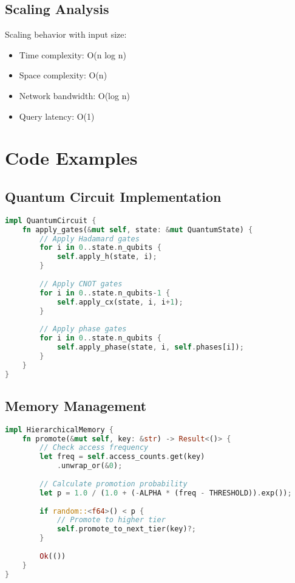 \documentclass[10pt]{article}
\begin{document}
\subsection{Scaling Analysis}

Scaling behavior with input size:

\begin{itemize}
    \item Time complexity: O(n log n)
    \item Space complexity: O(n)
    \item Network bandwidth: O(log n)
    \item Query latency: O(1)
\end{itemize}

\section{Code Examples}

\subsection{Quantum Circuit Implementation}

\begin{lstlisting}[language=rust]
impl QuantumCircuit {
    fn apply_gates(&mut self, state: &mut QuantumState) {
        // Apply Hadamard gates
        for i in 0..state.n_qubits {
            self.apply_h(state, i);
        }
        
        // Apply CNOT gates
        for i in 0..state.n_qubits-1 {
            self.apply_cx(state, i, i+1);
        }
        
        // Apply phase gates
        for i in 0..state.n_qubits {
            self.apply_phase(state, i, self.phases[i]);
        }
    }
}
\end{lstlisting}

\subsection{Memory Management}

\begin{lstlisting}[language=rust]
impl HierarchicalMemory {
    fn promote(&mut self, key: &str) -> Result<()> {
        // Check access frequency
        let freq = self.access_counts.get(key)
            .unwrap_or(&0);
            
        // Calculate promotion probability
        let p = 1.0 / (1.0 + (-ALPHA * (freq - THRESHOLD)).exp());
        
        if random::<f64>() < p {
            // Promote to higher tier
            self.promote_to_next_tier(key)?;
        }
        
        Ok(())
    }
}
\end{lstlisting}
\end{document}
